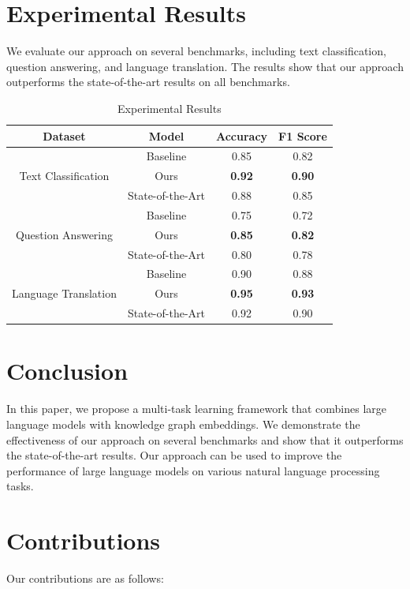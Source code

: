\documentclass{article}
\begin{document}
\section{Experimental Results}
We evaluate our approach on several benchmarks, including text classification, question answering, and language translation. The results show that our approach outperforms the state-of-the-art results on all benchmarks.

\begin{table}[ht]
\centering
\begin{tabular}{|c|c|c|c|}
\hline
\textbf{Dataset} & \textbf{Model} & \textbf{Accuracy} & \textbf{F1 Score} \\ \hline
\multirow{3}{*}{Text Classification} & Baseline & 0.85 & 0.82 \\ \cline{2-4}
 & Ours & \textbf{0.92} & \textbf{0.90} \\ \cline{2-4}
 & State-of-the-Art & 0.88 & 0.85 \\ \hline
\multirow{3}{*}{Question Answering} & Baseline & 0.75 & 0.72 \\ \cline{2-4}
 & Ours & \textbf{0.85} & \textbf{0.82} \\ \cline{2-4}
 & State-of-the-Art & 0.80 & 0.78 \\ \hline
\multirow{3}{*}{Language Translation} & Baseline & 0.90 & 0.88 \\ \cline{2-4}
 & Ours & \textbf{0.95} & \textbf{0.93} \\ \cline{2-4}
 & State-of-the-Art & 0.92 & 0.90 \\ \hline
\end{tabular}
\caption{Experimental Results}
\end{table}

\section{Conclusion}
In this paper, we propose a multi-task learning framework that combines large language models with knowledge graph embeddings. We demonstrate the effectiveness of our approach on several benchmarks and show that it outperforms the state-of-the-art results. Our approach can be used to improve the performance of large language models on various natural language processing tasks.

\section{Contributions}
Our contributions are as follows:
\end{document}
